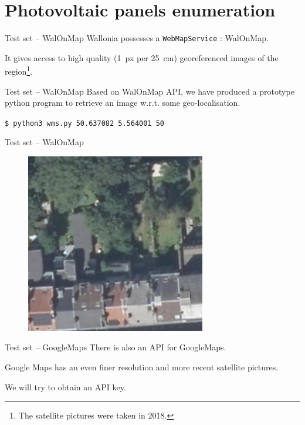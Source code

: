 \documentclass[12pt]{beamer}
\begin{document}
\section{Photovoltaic panels enumeration}

\begin{frame}{Test set -- WalOnMap}
    Wallonia possesses a \texttt{WebMapService} : \alert{WalOnMap}.
    
    It gives access to high quality (\SI{1}{px} per \SI{25}{\centi\meter}) georeferenced images of the region\footnote{The satellite pictures were taken in \alert{2018}.}.
\end{frame}

\begin{frame}{Test set -- WalOnMap}
    Based on \alert{WalOnMap} API, we have produced a \alert{prototype} python program to retrieve an image w.r.t. some geo-localisation.
    \begin{center}
        \texttt{\$ python3 wms.py 50.637082 5.564001 50}
    \end{center}
\end{frame}

\begin{frame}{Test set -- WalOnMap}    
    \begin{figure}
        \centering
        \includegraphics[width=0.70\textwidth]{resources/png/walonmap.jpg}
    \end{figure}
\end{frame}

\begin{frame}{Test set -- GoogleMaps}    
    There is also an API for \alert{GoogleMaps}.
    
    Google Maps has an even finer resolution and more recent satellite pictures.
    
    We will try to obtain an API \alert{key}.
\end{frame}
\end{document}
